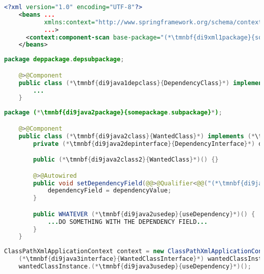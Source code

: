 \begin{lstlisting}[language=XML, title={Configuration XML}]
    <?xml version="1.0" encoding="UTF-8"?>
    <beans ...
           xmlns:context="http://www.springframework.org/schema/context"
           ...>
      <context:component-scan base-package="(*\tmnbf{di9xml1package}{somepackage.subpackage}[ForestGreen]*)"/>
    </beans>
\end{lstlisting}
\begin{lstlisting}[language=Java, title={Dependency class}]
    package deppackage.depsubpackage;

    @>@Component
    public class (*\tmnbf{di9java1depclass}{DependencyClass}*) implements (*\tmnbf{di9java1depinterface}{DependencyInterface}*) {
        ...
    }
\end{lstlisting}
\begin{lstlisting}[language=Java, title={Wanted class with the zero--parameter constructor and the setter method}]
    package (*\tmnbf{di9java2package}{somepackage.subpackage}*);

    @>@Component
    public class (*\tmnbf{di9java2class}{WantedClass}*) implements (*\tmnbf{di9java2interface}{WantedClassInterface}*) {
        private (*\tmnbf{di9java2depinterface}{DependencyInterface}*) dependencyField;

        public (*\tmnbf{di9java2class2}{WantedClass}*)() {}

        @>@Autowired
        public void setDependencyField(@@>@Qualifier<@@("(*\tmnbf{di9java2depbeanid}{dependencyClass}[ForestGreen]*)") (*\tmnbf{di9java2depinterface2}{DependencyInterface}*) dependencyValue) {
            dependencyField = dependencyValue;
        }

        public WHATEVER (*\tmnbf{di9java2usedep}{useDependency}*)() {
            ...DO SOMETHING WITH THE DEPENDENCY FIELD...
        }
    }
\end{lstlisting}
\begin{lstlisting}[language=Java, title={Usage}]
    ClassPathXmlApplicationContext context = new ClassPathXmlApplicationContext("configurationFile.xml");
    (*\tmnbf{di9java3interface}{WantedClassInterface}*) wantedClassInstance = context.getBean("(*\tmnbf{di9java3beanid}{wantedClass}[ForestGreen]*)", (*\tmnbf{di9java3interface2}{WantedClassInterface}*).class);
    wantedClassInstance.(*\tmnbf{di9java3usedep}{useDependency}*)();
\end{lstlisting}
